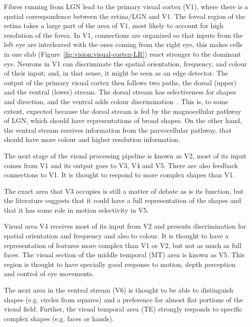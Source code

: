 Fibres running from LGN lead to the primary visual cortex (V1), where there is a spatial correspondence between the retina/LGN and V1. The foveal region of the retina takes a large part of the area of V1, most likely to account for high resolution of the fovea. In V1, connections are organized so that inputs from the left eye are interleaved with the ones coming from the right eye, this makes cells in one slab (Figure~\ref{fig:vision:visual-cortex-LR}) react stronger to the dominant eye. Neurons in V1 can discriminate the spatial orientation, frequency, and colour of their input; and, in that sense, it might be seen as an edge detector. The output of the primary visual cortex then follows two paths, the dorsal (upper) and the ventral (lower) stream. The dorsal stream has selectiveness for shapes and direction, and the ventral adds colour discrimination~\cite{thompson2000brain}. This is, to some extent, expected because the dorsal stream is fed by the magnocellular pathway of LGN, which should have representations of broad shapes. On the other hand, the ventral stream receives information from the parvocellular pathway, that should have more colour and higher resolution information\cite{webvision}.

The next stage of the visual processing pipeline is known as V2, most of its input comes from V1 and its output goes to V3, V4 and V5. There are also feedback connections to V1. It is thought to respond to more complex shapes than V1. 

The exact area that V3 occupies is still a matter of debate as is its function, but the literature suggests that it could have a full representation of the shapes and that it has some role in motion selectivity in V5. 

Visual area V4 receives most of its input from V2 and presents 
discrimination for spatial orientation and frequency and also to colour. It is thought to have a representation of features more complex than V1 or V2, but not as much as full faces. The visual section of the middle temporal (MT) area is known as V5. This region is thought to have specially good response to motion, depth perception and control of eye movements. 

The next area in the ventral stream (V6) is thought to be able to distinguish shapes (e.g. circles from squares) and a preference for almost flat portions of the visual field. Further, the visual temporal area (TE) strongly responds to specific complex shapes (e.g. faces or  hands)\cite{eye-brain-vision-hubel1995,thompson2000brain}.
